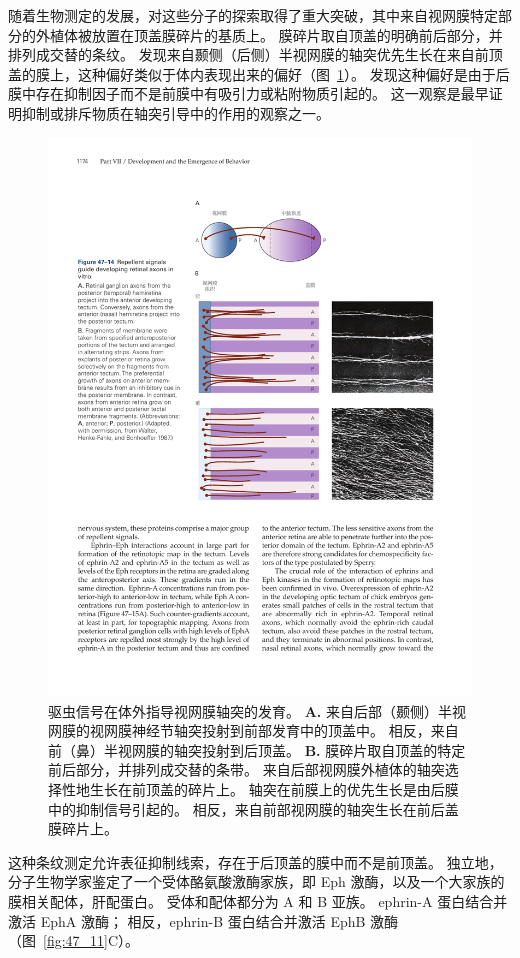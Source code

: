 随着生物测定的发展，对这些分子的探索取得了重大突破，其中来自视网膜特定部分的外植体被放置在顶盖膜碎片的基质上。
膜碎片取自顶盖的明确前后部分，并排列成交替的条纹。 
发现来自颞侧（后侧）半视网膜的轴突优先生长在来自前顶盖的膜上，这种偏好类似于体内表现出来的偏好（图~\ref{fig:47_14}）。
发现这种偏好是由于后膜中存在抑制因子而不是前膜中有吸引力或粘附物质引起的。
这一观察是最早证明抑制或排斥物质在轴突引导中的作用的观察之一。


\begin{figure}[htbp]
	\centering
	\includegraphics[width=0.8\linewidth]{chap47/fig_47_14}
	\caption{驱虫信号在体外指导视网膜轴突的发育。
		\textbf{A.} 来自后部（颞侧）半视网膜的视网膜神经节轴突投射到前部发育中的顶盖中。
		相反，来自前（鼻）半视网膜的轴突投射到后顶盖。
		\textbf{B.} 膜碎片取自顶盖的特定前后部分，并排列成交替的条带。
		来自后部视网膜外植体的轴突选择性地生长在前顶盖的碎片上。
		轴突在前膜上的优先生长是由后膜中的抑制信号引起的。
		相反，来自前部视网膜的轴突生长在前后盖膜碎片上\cite{walter1987avoidance}。}
	\label{fig:47_14}
\end{figure}


这种条纹测定允许表征抑制线索，存在于后顶盖的膜中而不是前顶盖。
独立地，分子生物学家鉴定了一个受体酪氨酸激酶家族，即 Eph 激酶，以及一个大家族的膜相关配体，肝配蛋白。
受体和配体都分为 A 和 B 亚族。
ephrin-A 蛋白结合并激活 EphA 激酶；
相反，ephrin-B 蛋白结合并激活 EphB 激酶（图~\ref{fig:47_11}C）。


